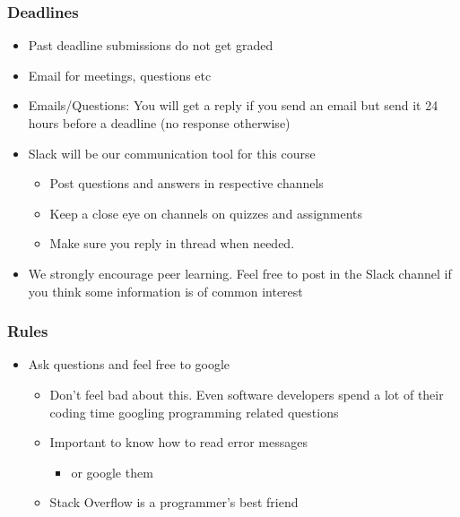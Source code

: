 \documentclass[compress, aspectratio=54]{beamer}
\begin{document}
\begin{frame}
\frametitle{Deadlines}

\begin{itemize}
\item Past deadline submissions do not get graded
\item Email for meetings, questions etc 
\item Emails/Questions: You will get a reply if you send an email but send it 24 hours before a deadline (no response otherwise)
\item Slack will be our communication tool for this course
\begin{itemize}
\item Post questions and answers in respective channels
\item Keep a close eye on channels on quizzes and assignments
\item Make sure you reply in thread when needed.
\end{itemize}
\item We strongly encourage peer learning. Feel free to post in the Slack channel if you think some information is of common interest
\end{itemize}

\end{frame}

\begin{frame}
\frametitle{Rules}
\begin{itemize}
\item Ask questions and feel free to google
\begin{itemize}
\item Don't feel bad about this. Even software developers spend a lot of their coding time googling programming related questions
\item Important to know how to read error messages
\begin{itemize}

\item or google them
\end{itemize}
\item Stack Overflow is a programmer's best friend
\end{itemize}
\end{itemize}
\end{frame}

\end{document}
